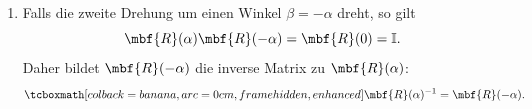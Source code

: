 \begin{enumerate}
\begin{equation}
\begin{split}
\begin{pmatrix}
    \sin(\beta) & \cos(\beta) 
  \end{pmatrix}\\
  &= \begin{pmatrix}
    \cos(\alpha)\cos(\beta)- \sin(\alpha)\sin(\beta)& -\cos(\alpha)\sin(\beta)-\sin(\alpha)\cos(\beta) \\ 
    \cos(\alpha)\sin(\beta)+\sin(\alpha)\cos(\beta) & - \sin(\alpha)\sin(\beta)+\cos(\alpha)\cos(\beta) 
  \end{pmatrix}\\
  &=\begin{pmatrix}
    \cos(\alpha+\beta) & -\sin(\alpha+\beta) \\ 
    \sin(\alpha+\beta) & \cos(\alpha+\beta) 
  \end{pmatrix}\\
  &= \mbf{R}(\alpha+\beta).
    \end{split}
  \end{equation}
  Also, $\mbf{r} = \mbf{R}(\alpha+\beta)\mbf{r}''$. 
  \item Falls die zweite Drehung um einen Winkel $\beta = -\alpha$ dreht, so gilt
  \begin{equation}
    \mbf{R}(\alpha)\mbf{R}(-\alpha) = \mbf{R}(0) = \mathbb{I}.
  \end{equation}
  Daher bildet $\mbf{R}(-\alpha)$ die inverse Matrix zu $\mbf{R}(\alpha)$:
  \begin{equation}
    \eqbox{\mbf{R}(\alpha)^{-1}=\mbf{R}(-\alpha).}
  \end{equation}
\end{enumerate}

